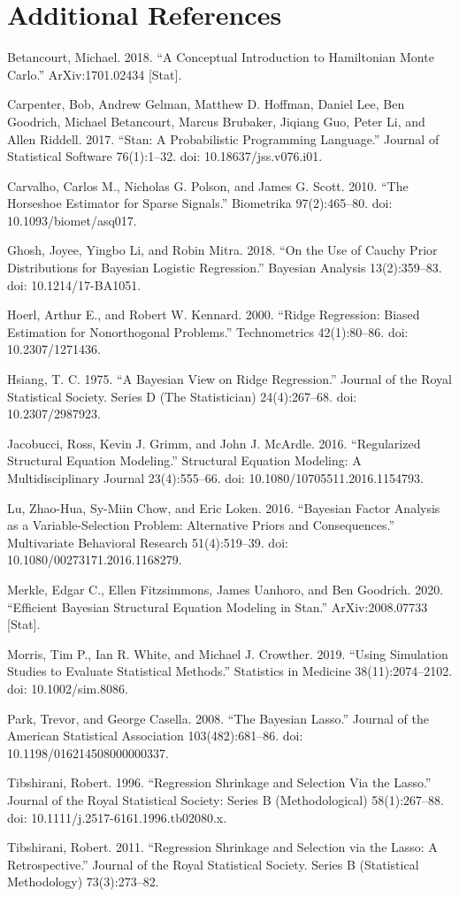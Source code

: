 \documentclass[
  man]{apa6}
\begin{document}
\begingroup
\setlength{\parskip}{0in}
\setlength{\parindent}{-0.27in}
\setlength{\leftskip}{0.5in}

\hypertarget{additional-references}{%
\section{Additional References}\label{additional-references}}

Betancourt, Michael. 2018. ``A Conceptual Introduction to Hamiltonian Monte Carlo.'' ArXiv:1701.02434 {[}Stat{]}.

Carpenter, Bob, Andrew Gelman, Matthew D. Hoffman, Daniel Lee, Ben Goodrich, Michael Betancourt, Marcus Brubaker, Jiqiang Guo, Peter Li, and Allen Riddell. 2017. ``Stan: A Probabilistic Programming Language.'' Journal of Statistical Software 76(1):1--32. doi: 10.18637/jss.v076.i01.

Carvalho, Carlos M., Nicholas G. Polson, and James G. Scott. 2010. ``The Horseshoe Estimator for Sparse Signals.'' Biometrika 97(2):465--80. doi: 10.1093/biomet/asq017.

Ghosh, Joyee, Yingbo Li, and Robin Mitra. 2018. ``On the Use of Cauchy Prior Distributions for Bayesian Logistic Regression.'' Bayesian Analysis 13(2):359--83. doi: 10.1214/17-BA1051.

Hoerl, Arthur E., and Robert W. Kennard. 2000. ``Ridge Regression: Biased Estimation for Nonorthogonal Problems.'' Technometrics 42(1):80--86. doi: 10.2307/1271436.

Hsiang, T. C. 1975. ``A Bayesian View on Ridge Regression.'' Journal of the Royal Statistical Society. Series D (The Statistician) 24(4):267--68. doi: 10.2307/2987923.

Jacobucci, Ross, Kevin J. Grimm, and John J. McArdle. 2016. ``Regularized Structural Equation Modeling.'' Structural Equation Modeling: A Multidisciplinary Journal 23(4):555--66. doi: 10.1080/10705511.2016.1154793.

Lu, Zhao-Hua, Sy-Miin Chow, and Eric Loken. 2016. ``Bayesian Factor Analysis as a Variable-Selection Problem: Alternative Priors and Consequences.'' Multivariate Behavioral Research 51(4):519--39. doi: 10.1080/00273171.2016.1168279.

Merkle, Edgar C., Ellen Fitzsimmons, James Uanhoro, and Ben Goodrich. 2020. ``Efficient Bayesian Structural Equation Modeling in Stan.'' ArXiv:2008.07733 {[}Stat{]}.

Morris, Tim P., Ian R. White, and Michael J. Crowther. 2019. ``Using Simulation Studies to Evaluate Statistical Methods.'' Statistics in Medicine 38(11):2074--2102. doi: 10.1002/sim.8086.

Park, Trevor, and George Casella. 2008. ``The Bayesian Lasso.'' Journal of the American Statistical Association 103(482):681--86. doi: 10.1198/016214508000000337.

Tibshirani, Robert. 1996. ``Regression Shrinkage and Selection Via the Lasso.'' Journal of the Royal Statistical Society: Series B (Methodological) 58(1):267--88. doi: 10.1111/j.2517-6161.1996.tb02080.x.

Tibshirani, Robert. 2011. ``Regression Shrinkage and Selection via the Lasso: A Retrospective.'' Journal of the Royal Statistical Society. Series B (Statistical Methodology) 73(3):273--82.
\end{document}
